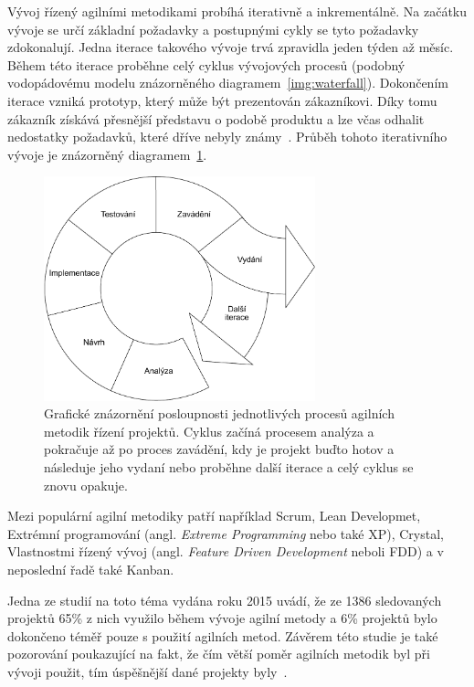 Vývoj řízený agilními metodikami probíhá iterativně a inkrementálně. Na začátku vývoje se určí základní požadavky a postupnými cykly se tyto požadavky zdokonalují. Jedna iterace takového vývoje trvá zpravidla jeden týden až měsíc. Během této iterace proběhne celý cyklus vývojových procesů (podobný vodopádovému modelu znázorněného diagramem~\ref{img:waterfall}). Dokončením iterace vzniká prototyp, který může být prezentován zákazníkovi. Díky tomu zákazník získává přesnější představu o podobě produktu a lze včas odhalit nedostatky požadavků, které dříve nebyly známy~\cite{bib:agile-impact}. 
Průběh tohoto iterativního vývoje je znázorněný diagramem~\ref{img:agile}.

\begin{figure}[H]
	\centering
	\includegraphics[width=0.7\textwidth]{obrazky-figures/agile.pdf}
	\caption{Grafické znázornění posloupnosti jednotlivých procesů agilních metodik řízení projektů. Cyklus začíná procesem analýza a pokračuje až po proces zavádění, kdy je projekt buďto hotov a následuje jeho vydaní nebo proběhne další iterace a celý cyklus se znovu opakuje.}
	\label{img:agile}
\end{figure}

Mezi populární agilní metodiky patří například Scrum, Lean Developmet, Extrémní programování (angl. \emph{Extreme Programming} nebo také XP), Crystal, Vlastnostmi řízený vývoj (angl. \emph{Feature Driven Development} neboli FDD) a v neposlední řadě také Kanban.

Jedna ze studií na toto téma vydána roku 2015 uvádí, že ze 1386 sledovaných projektů 65\% z nich využilo během vývoje agilní metody a 6\% projektů bylo dokončeno téměř pouze s použití agilních metod. Závěrem této studie je také pozorování poukazující na fakt, že čím větší poměr agilních metodik byl při vývoji použit, tím úspěšnější dané projekty byly~\cite{bib:agile-work}.

